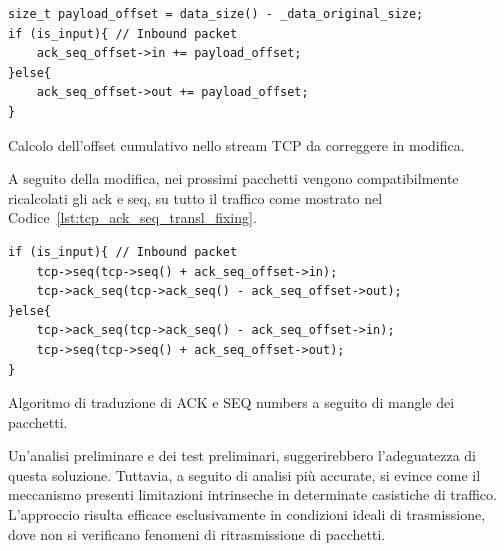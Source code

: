 \begin{listing}[H]
\begin{verbatim}
size_t payload_offset = data_size() - _data_original_size;
if (is_input){ // Inbound packet
    ack_seq_offset->in += payload_offset;
}else{
    ack_seq_offset->out += payload_offset;
}
\end{verbatim}
\vspace{-1em}
\caption{Calcolo dell'offset cumulativo nello stream TCP da correggere in modifica.}\label{lst:tcp_ack_seq_transl}
\end{listing}
A seguito della modifica, nei prossimi pacchetti vengono compatibilmente ricalcolati gli \gls{ack} e \gls{seq}, su tutto il traffico come mostrato nel Codice~\ref{lst:tcp_ack_seq_transl_fixing}.
\begin{listing}[H]
\begin{verbatim}
if (is_input){ // Inbound packet
    tcp->seq(tcp->seq() + ack_seq_offset->in);
    tcp->ack_seq(tcp->ack_seq() - ack_seq_offset->out);
}else{
    tcp->ack_seq(tcp->ack_seq() - ack_seq_offset->in);
    tcp->seq(tcp->seq() + ack_seq_offset->out);
}
\end{verbatim}
\vspace{-1em}
\caption{Algoritmo di traduzione di ACK e SEQ numbers a seguito di mangle dei pacchetti.}\label{lst:tcp_ack_seq_transl_fixing}
\end{listing}
Un'analisi preliminare e dei test preliminari, suggerirebbero l'adeguatezza di questa soluzione. Tuttavia, a seguito di analisi più accurate, si evince come il meccanismo presenti limitazioni intrinseche in determinate casistiche di traffico. L'approccio risulta efficace esclusivamente in condizioni ideali di trasmissione, dove non si verificano fenomeni di ritrasmissione di pacchetti.

